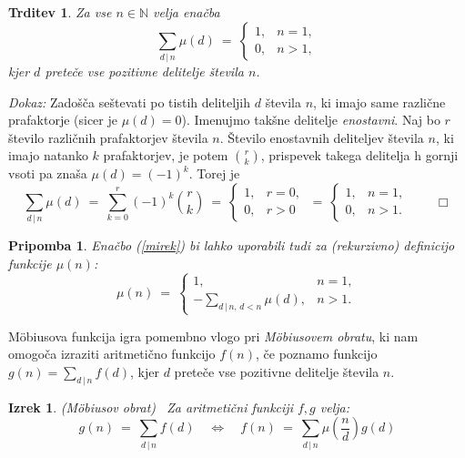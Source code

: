 \documentclass[a4paper,12pt]{article}
\def\N{\mathbb{N}} %
\def\qedm{\qquad\Box}   %
\newtheorem{izrek}{Izrek}
\newtheorem{trditev}{Trditev}
\newtheorem{pripomba}{Pripomba}
\begin{document}
\begin{trditev}
Za vse $n \in \N$ velja enačba
\begin{equation}
\label{mirek}
\sum_{d\,|\,n} \mu(d)\ =\ \left\{
\begin{array}{ll}
1, & n = 1, \\
0, & n > 1,
\end{array}
\right.
\end{equation}
kjer $d$ preteče vse pozitivne delitelje števila $n$.
\end{trditev}

\noindent
{\em Dokaz:\/} 
Zadošča seštevati po tistih deliteljih $d$ števila $n$, ki imajo same različne prafaktorje (sicer je
$\mu(d) = 0$). Imenujmo takšne delitelje {\em enostavni}. Naj bo $r$ število različnih prafaktorjev
števila $n$. Število enostavnih deliteljev števila $n$, ki imajo natanko $k$ prafaktorjev, je potem ${r \choose k}$,
prispevek takega delitelja h gornji vsoti pa znaša $\mu(d) = (-1)^k$. Torej je
\[
\sum_{d\,|\,n} \mu(d)\ =\ 
\sum_{k=0}^r (-1)^k {r \choose k} \ =\ 
\left\{
\begin{array}{ll}
1, & r = 0, \\
0, & r > 0
\end{array}
\right.\ =\ \left\{
\begin{array}{ll}
1, & n = 1, \\
0, & n > 1.
\end{array}
\right. \qedm
\]

\begin{pripomba}
Enačbo (\ref{mirek}) bi lahko uporabili tudi za (rekurzivno) definicijo funkcije $\mu(n)$:
\[
\mu(n)\ =\ \left\{
\begin{array}{cl}
1, & n = 1, \\
-\displaystyle\sum_{d\,|\,n, \,d < n} \mu(d), & n > 1.
\end{array}
\right.
\]
\end{pripomba}

M\"obiusova funkcija igra pomembno vlogo pri {\em M\"obiusovem obratu}, ki nam omogoča
izraziti aritmetično funkcijo $f(n)$, če poznamo funkcijo $g(n) = \sum_{d\,|\,n} f(d)$,
kjer $d$ preteče vse pozitivne delitelje števila $n$.

\begin{izrek} \em{(M\"obiusov obrat)} \ 
Za aritmetični funkciji $f, g$ velja:
\[
g(n)\ =\ \sum_{d\,|\,n} f(d)\quad \Longleftrightarrow\quad f(n)\ =\ \sum_{d\,|\,n} \mu\left(\frac{n}{d}\right)g(d)
\]
\end{izrek}
\end{document}
